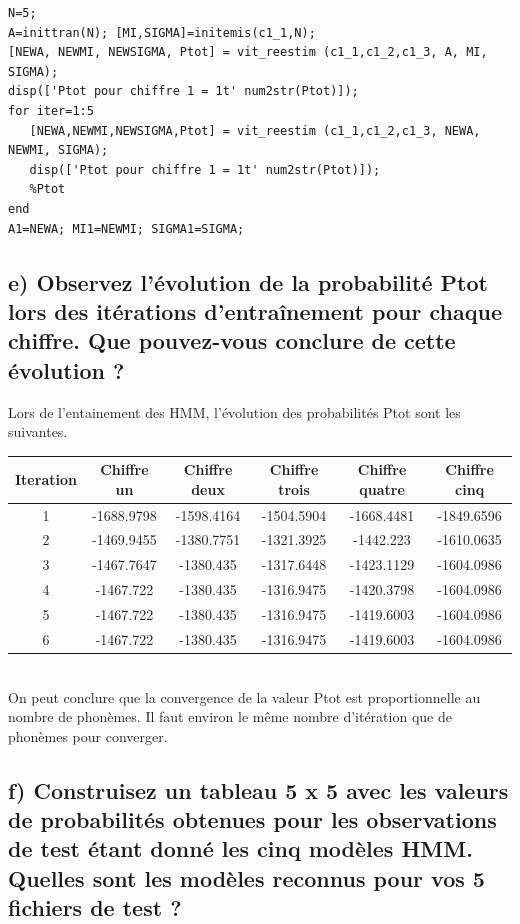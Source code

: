 \begin{lstlisting}
N=5; 
A=inittran(N); [MI,SIGMA]=initemis(c1_1,N); 
[NEWA, NEWMI, NEWSIGMA, Ptot] = vit_reestim (c1_1,c1_2,c1_3, A, MI, SIGMA);
disp(['Ptot pour chiffre 1 = 1t' num2str(Ptot)]);
for iter=1:5
   [NEWA,NEWMI,NEWSIGMA,Ptot] = vit_reestim (c1_1,c1_2,c1_3, NEWA, NEWMI, SIGMA);  
   disp(['Ptot pour chiffre 1 = 1t' num2str(Ptot)]);
   %Ptot
end
A1=NEWA; MI1=NEWMI; SIGMA1=SIGMA;
\end{lstlisting}

\subsection{e) Observez l'évolution de la probabilité Ptot lors des itérations d'entraînement pour chaque chiffre. Que pouvez-vous conclure de cette évolution ?}

Lors de l'entainement des HMM, l'évolution des probabilités Ptot sont les suivantes.
\\

\begin{tabular}{|c|c|c|c|c|c|}
\hline 
Iteration & Chiffre un & Chiffre deux & Chiffre trois & Chiffre quatre & Chiffre cinq \\ 
\hline 
1 & -1688.9798 & -1598.4164 & -1504.5904 & -1668.4481 & -1849.6596 \\ 
\hline 
2 & -1469.9455 & -1380.7751 & -1321.3925 & -1442.223 & -1610.0635 \\ 
\hline 
3 & -1467.7647 & -1380.435 & -1317.6448 & -1423.1129 & -1604.0986 \\ 
\hline 
4 & -1467.722 & -1380.435 & -1316.9475 & -1420.3798 & -1604.0986 \\ 
\hline 
5 & -1467.722 & -1380.435 & -1316.9475 & -1419.6003 & -1604.0986 \\ 
\hline 
6 & -1467.722 & -1380.435 & -1316.9475 & -1419.6003 & -1604.0986 \\ 
\hline 
\end{tabular} 
\\

On peut conclure que la convergence de la valeur Ptot est proportionnelle au nombre de phonèmes. Il faut environ le même nombre d'itération que de phonèmes pour converger.

\subsection{f) Construisez un tableau 5 x 5 avec les valeurs de probabilités obtenues pour les observations de test étant donné les cinq modèles HMM. Quelles sont les modèles reconnus pour vos 5 fichiers de test ?}

